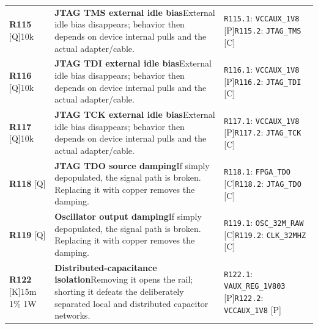 \documentclass[11pt,a4paper]{article}
\begin{document}
\begin{longtable}{@{}P{27mm}P{77mm}P{62mm}@{}}
\textbf{R115} [Q]\newline 10k & \textbf{JTAG TMS external idle bias}\newline External idle bias disappears; behavior then depends on device internal pulls and the actual adapter/cable. & \nolinkurl{R115.1}: \nolinkurl{VCCAUX_1V8} [P]\newline \nolinkurl{R115.2}: \nolinkurl{JTAG_TMS} [C] \\
\textbf{R116} [Q]\newline 10k & \textbf{JTAG TDI external idle bias}\newline External idle bias disappears; behavior then depends on device internal pulls and the actual adapter/cable. & \nolinkurl{R116.1}: \nolinkurl{VCCAUX_1V8} [P]\newline \nolinkurl{R116.2}: \nolinkurl{JTAG_TDI} [C] \\
\textbf{R117} [Q]\newline 10k & \textbf{JTAG TCK external idle bias}\newline External idle bias disappears; behavior then depends on device internal pulls and the actual adapter/cable. & \nolinkurl{R117.1}: \nolinkurl{VCCAUX_1V8} [P]\newline \nolinkurl{R117.2}: \nolinkurl{JTAG_TCK} [C] \\
\textbf{R118} [Q] & \textbf{JTAG TDO source damping}\newline If simply depopulated, the signal path is broken. Replacing it with copper removes the damping. & \nolinkurl{R118.1}: \nolinkurl{FPGA_TDO} [C]\newline \nolinkurl{R118.2}: \nolinkurl{JTAG_TDO} [C] \\
\textbf{R119} [Q] & \textbf{Oscillator output damping}\newline If simply depopulated, the signal path is broken. Replacing it with copper removes the damping. & \nolinkurl{R119.1}: \nolinkurl{OSC_32M_RAW} [C]\newline \nolinkurl{R119.2}: \nolinkurl{CLK_32MHZ} [C] \\
\textbf{R122} [K]\newline 15m 1\% 1W & \textbf{Distributed-capacitance isolation}\newline Removing it opens the rail; shorting it defeats the deliberately separated local and distributed capacitor networks. & \nolinkurl{R122.1}: \nolinkurl{VAUX_REG_1V803} [P]\newline \nolinkurl{R122.2}: \nolinkurl{VCCAUX_1V8} [P] \\

\end{longtable}
\end{document}
